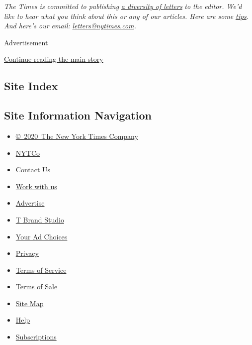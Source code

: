 \emph{The Times is committed to publishing}
\href{https://www.nytimes.com/2019/01/31/opinion/letters/letters-to-editor-new-york-times-women.html}{\emph{a
diversity of letters}} \emph{to the editor. We'd like to hear what you
think about this or any of our articles. Here are some}
\href{https://help.nytimes.com/hc/en-us/articles/115014925288-How-to-submit-a-letter-to-the-editor}{\emph{tips}}\emph{.
And here's our email:}
\href{mailto:letters@nytimes.com}{\emph{letters@nytimes.com}}\emph{.}

Advertisement

\protect\hyperlink{after-bottom}{Continue reading the main story}

\hypertarget{site-index}{%
\subsection{Site Index}\label{site-index}}

\hypertarget{site-information-navigation}{%
\subsection{Site Information
Navigation}\label{site-information-navigation}}

\begin{itemize}
\tightlist
\item
  \href{https://help.nytimes.com/hc/en-us/articles/115014792127-Copyright-notice}{©~2020~The
  New York Times Company}
\end{itemize}

\begin{itemize}
\tightlist
\item
  \href{https://www.nytco.com/}{NYTCo}
\item
  \href{https://help.nytimes.com/hc/en-us/articles/115015385887-Contact-Us}{Contact
  Us}
\item
  \href{https://www.nytco.com/careers/}{Work with us}
\item
  \href{https://nytmediakit.com/}{Advertise}
\item
  \href{http://www.tbrandstudio.com/}{T Brand Studio}
\item
  \href{https://www.nytimes.com/privacy/cookie-policy\#how-do-i-manage-trackers}{Your
  Ad Choices}
\item
  \href{https://www.nytimes.com/privacy}{Privacy}
\item
  \href{https://help.nytimes.com/hc/en-us/articles/115014893428-Terms-of-service}{Terms
  of Service}
\item
  \href{https://help.nytimes.com/hc/en-us/articles/115014893968-Terms-of-sale}{Terms
  of Sale}
\item
  \href{https://spiderbites.nytimes.com}{Site Map}
\item
  \href{https://help.nytimes.com/hc/en-us}{Help}
\item
  \href{https://www.nytimes.com/subscription?campaignId=37WXW}{Subscriptions}
\end{itemize}
